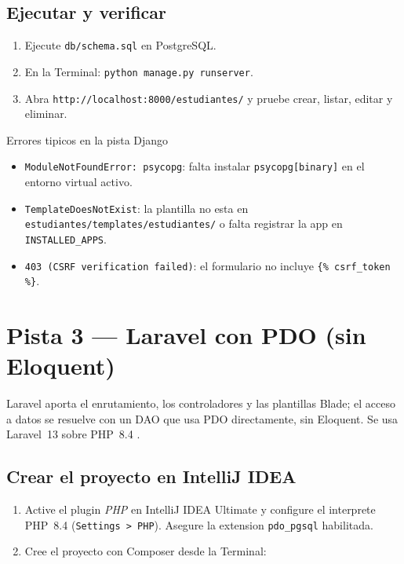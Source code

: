 \subsection{Ejecutar y verificar}
\label{ap:crud:django:run}

\begin{enumerate}
\item Ejecute \texttt{db/schema.sql} en PostgreSQL.
\item En la Terminal: \texttt{python manage.py runserver}.
\item Abra \texttt{http://localhost:8000/estudiantes/} y pruebe crear,
listar, editar y eliminar.
\end{enumerate}

\begin{cajaadvertencia}{Errores tipicos en la pista Django}
\begin{itemize}
\item \texttt{ModuleNotFoundError: psycopg}: falta instalar
\texttt{psycopg[binary]} en el entorno virtual activo.
\item \texttt{TemplateDoesNotExist}: la plantilla no esta en
\texttt{estudiantes/templates/estudiantes/} o falta registrar la app en
\texttt{INSTALLED\_APPS}.
\item \texttt{403 (CSRF verification failed)}: el formulario no incluye
\texttt{\{\% csrf\_token \%\}}.
\end{itemize}
\end{cajaadvertencia}

\section{Pista 3 --- Laravel con PDO (sin Eloquent)}
\label{ap:crud:laravel}

Laravel aporta el enrutamiento, los controladores y las plantillas
Blade; el acceso a datos se resuelve con un DAO que usa PDO
directamente, sin Eloquent. Se usa Laravel~13 sobre PHP~8.4
\cite{laravel13docs,phppdo}.

\subsection{Crear el proyecto en IntelliJ IDEA}
\label{ap:crud:laravel:crear}

\begin{enumerate}
\item Active el plugin \emph{PHP} en IntelliJ IDEA Ultimate y configure
el interprete PHP~8.4 (\texttt{Settings > PHP}). Asegure la extension
\texttt{pdo\_pgsql} habilitada.
\item Cree el proyecto con Composer desde la Terminal:
\end{enumerate}

